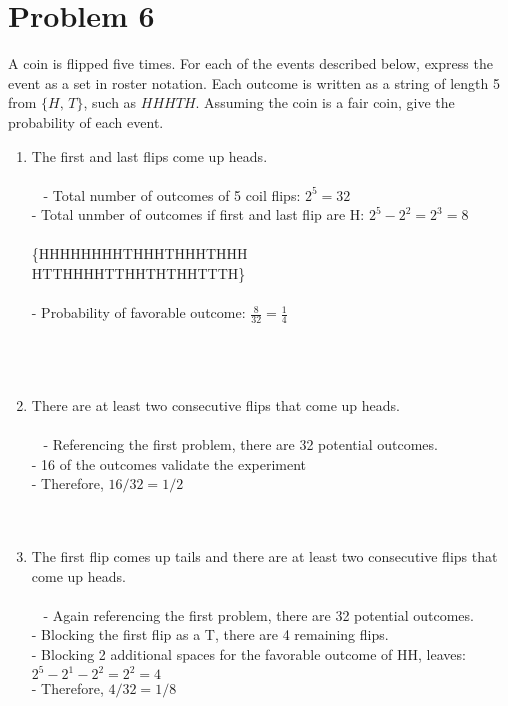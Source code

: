 \documentclass{amsart}
\theoremstyle{definition}
\theoremstyle{Exercise}
\theoremstyle{remark}
\theoremstyle{rule}
\numberwithin{equation}{section}
\begin{document}
\section*{Problem 6}
A coin is flipped five times. For each of the events described below, express the event as a set in roster notation. Each outcome is written as a string of length 5 from $\{H,\, T\}$, such as $HHHTH$. Assuming the coin is a fair coin, give the probability of each event.\\
\begin{enumerate}[label=(\alph*)]
\item The first and last flips come up heads.\\\\\
  - Total number of outcomes of 5 coil flips: $2^5=32$\\
  - Total unmber of outcomes if first and last flip are H: $2^5-2^2=2^3=8$
  \\\\
  \{HHHHH\;\;HHHTH\;\;HHTHH\;\;HTHHH\\
  HTTHH\;\;HHTTH\;\;HTHTH\;\;\;HTTTH\}
  \\\\
  - Probability of favorable outcome: $\frac{8}{32}=\frac{1}{4}$\\
\\\\\
\item There are at least two consecutive flips that come up heads.\\\\\
  - Referencing the first problem, there are 32 potential outcomes.\\
  - 16 of the outcomes validate the experiment\\
  - Therefore, $16/32 = 1/2$
\\\\\
\item The first flip comes up tails and there are at least two consecutive flips that come up heads.\\\\\
  - Again referencing the first problem, there are 32 potential outcomes.\\
  - Blocking the first flip as a T, there are 4 remaining flips.\\
  - Blocking 2 additional spaces for the favorable outcome of HH, leaves: $2^5-2^1-2^2 = 2^2 = 4$\\
  - Therefore, $4/32 = 1/8$
\\\\\
\end{enumerate}
\end{document}
